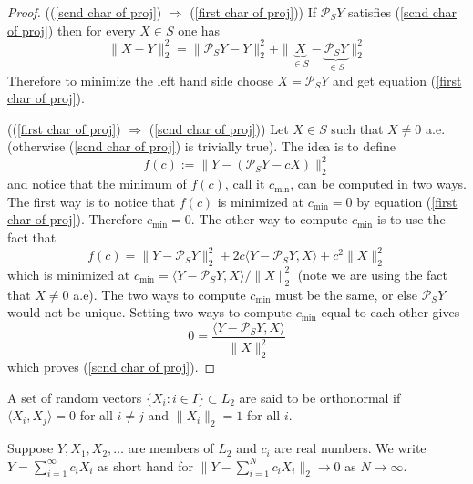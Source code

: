 \begin{proof}
((\ref{scnd char of proj}) $ \Rightarrow $ (\ref{first char of proj}))
If $\mathcal P_SY$ satisfies (\ref{scnd char of proj}) then for every $X \in S$ one has
\[ \| X - Y \|_2^2 = \| \mathcal P_S Y -Y \|_2^2 + \| \underbrace{ X }_{\in S} - \underbrace{\mathcal P_S Y }_{\in S}\|_2^2 \]
Therefore to minimize the left hand side choose $X = \mathcal P_S Y$ and get equation (\ref{first char of proj}).


((\ref{first char of proj}) $ \Rightarrow $ (\ref{scnd char of proj}))
Let $X\in S$ such that $X \neq 0$ a.e. (otherwise (\ref{scnd char of proj}) is trivially true). The idea is to define
\[f(c) := \|Y - (\mathcal P_S Y - cX)  \|_2^2  \]
and notice that the minimum of $f(c)$, call it $c_\text{min}$, can be computed in two ways. The first way is to  notice that $f(c)$ is minimized at $c_\text{min} = 0$ by equation (\ref{first char of proj}). Therefore $c_\text{min} = 0$. The other way to compute $c_\text{min}$ is to use the fact that
\[f(c) = \|Y - \mathcal P_SY\|^2_2 + 2c\langle Y - \mathcal P_SY, X\rangle + c^2\|X\|^2_2  \]
which is minimized at $c_\text{min} = \langle Y - \mathcal P_SY, X\rangle / \|X \|^2_2 $ (note we are using the fact that $X \neq 0$ a.e). The two ways to compute $c_\text{min}$ must be the same, or else $\mathcal P_S Y$ would not be unique. Setting two ways to compute $c_\text{min}$ equal to each other gives
\[ 0 = \frac{\langle Y - \mathcal P_SY, X\rangle} { \|X \|^2_2 }  \]
which proves (\ref{scnd char of proj}).
\end{proof}


\begin{definition}
A set of random vectors $\{ X_i:i\in I\}\subset L_2$ are said to be orthonormal if $\langle X_i, X_j\rangle = 0$ for all $i\neq j$ and $\| X_i\|_2=1$ for all $i$.
\end{definition}


\begin{definition}
Suppose $Y, X_1, X_2, \ldots$ are members of $L_2$ and $c_i$ are real numbers. We write $Y = \sum_{i=1}^\infty c_i X_i$ as short hand for $\| Y - \sum_{i=1}^N c_i X_i \|_2\rightarrow 0$ as $N\rightarrow \infty$.
\end{definition}



